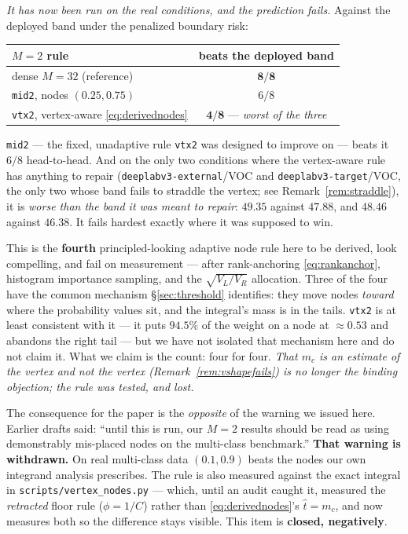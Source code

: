 \documentclass[11pt]{article}
\theoremstyle{remark}
\begin{document}
\begin{enumerate}
\emph{It has now been run on the real conditions, and the prediction fails.} Against the
deployed band under the penalized boundary risk:

\begin{center}
\small
\begin{tabular}{lc}
\toprule
$M=2$ rule & beats the deployed band \\
\midrule
dense $M{=}32$ (reference)                          & $\mathbf{8/8}$ \\
\texttt{mid2}, nodes $(0.25, 0.75)$                 & $6/8$ \\
\texttt{vtx2}, vertex-aware \eqref{eq:derivednodes} & $\mathbf{4/8}$ --- \emph{worst of the three} \\
\bottomrule
\end{tabular}
\end{center}

\texttt{mid2} --- the fixed, unadaptive rule \texttt{vtx2} was designed to improve on ---
beats it $6/8$ head-to-head. And on the only two conditions where the vertex-aware rule
has anything to repair (\texttt{deeplabv3-external}/VOC and \texttt{deeplabv3-target}/VOC,
the only two whose band fails to straddle the vertex; see Remark~\ref{rem:straddle}),
it is \emph{worse than
the band it was meant to repair}: $49.35$ against $47.88$, and $48.46$ against $46.38$.
It fails hardest exactly where it was supposed to win.

This is the \textbf{fourth} principled-looking adaptive node rule here to be derived,
look compelling, and fail on measurement --- after rank-anchoring \eqref{eq:rankanchor},
histogram importance sampling, and the $\sqrt{V_L/V_R}$ allocation. Three of the four
have the common mechanism \S\ref{sec:threshold} identifies: they move nodes \emph{toward}
where the probability values sit, and the integral's mass is in the tails.
\texttt{vtx2} is at least consistent with it --- it puts $94.5\%$ of the weight on a node
at $\approx 0.53$ and abandons the right tail --- but we have not isolated that mechanism
here and do not claim it. What we claim is the count: four for four. \emph{That $m_c$ is
an estimate of the vertex and not the vertex (Remark~\ref{rem:vshapefails}) is no longer
the binding objection; the rule was tested, and lost.}

The consequence for the paper is the \emph{opposite} of the warning we issued here.
Earlier drafts said: ``until this is run, our $M=2$ results should be read as using
demonstrably mis-placed nodes on the multi-class benchmark.'' \textbf{That warning is
withdrawn.} On real multi-class data $(0.1, 0.9)$ beats the nodes our own integrand
analysis prescribes. The rule is also measured against the exact integral in
\texttt{scripts/vertex\_nodes.py} --- which, until an audit caught it, measured the
\emph{retracted} floor rule ($\phi = 1/C$) rather than \eqref{eq:derivednodes}'s
$\hat t = m_c$, and now measures both so the difference stays visible. This item is
\textbf{closed, negatively}.


\end{enumerate}
\end{document}
